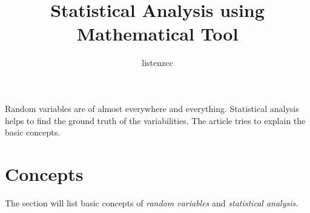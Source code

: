 \documentclass[a4paper]{article}
\title{Statistical Analysis using Mathematical Tool}
\author{listenzcc}
\begin{document}
\maketitle

\abstract
Random variables are of almost everywhere and everything.
Statistical analysis helps to find the ground truth of the variabilities.
The article tries to explain the basic concepts.

\tableofcontents

\section{Concepts}
The section will list basic concepts of \emph{random variables} and \emph{statistical analysis}.

\end{document}

